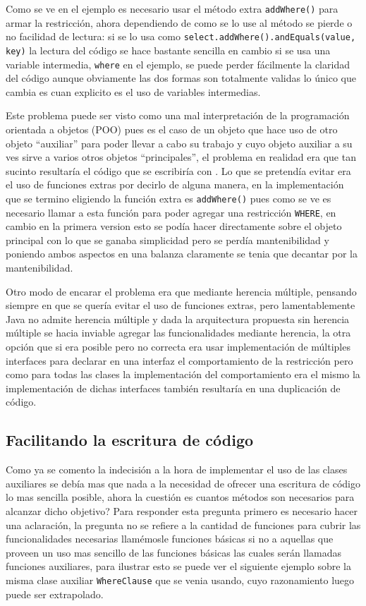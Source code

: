 Como se ve en el ejemplo es necesario usar el método extra \verb=addWhere()= para armar la restricción, ahora dependiendo de como se lo use al método se pierde o no facilidad de lectura:  si se lo usa como \verb=select.addWhere().andEquals(value, key)= la lectura del código se hace bastante sencilla en cambio si se usa una variable intermedia, \verb=where= en el ejemplo, se puede perder fácilmente la claridad del código aunque obviamente las dos formas son totalmente validas lo único que cambia es cuan explicito es el uso de variables intermedias.

Este problema puede ser visto como una mal interpretación de la programación orientada a objetos (POO) pues es el caso de un objeto que hace uso de otro objeto ``auxiliar'' para poder llevar a cabo su trabajo y cuyo objeto auxiliar a su ves sirve a varios otros objetos ``principales'', el problema en realidad era que tan sucinto resultaría el código que se escribiría con \jj. Lo que se pretendía evitar era el uso de funciones extras por decirlo de alguna manera, en la implementación que se termino eligiendo la función extra es \verb=addWhere()= pues como se ve es necesario llamar a esta función para poder agregar una restricción \verb=WHERE=, en cambio en la primera version esto se podía hacer directamente sobre el objeto principal con lo que se ganaba simplicidad pero se perdía mantenibilidad y poniendo ambos aspectos en una balanza claramente se tenia que decantar por la mantenibilidad.

Otro modo de encarar el problema era que mediante herencia múltiple, pensando siempre en que se quería evitar el uso de funciones extras, pero lamentablemente Java no admite herencia múltiple\cite{java:jdbc:tutorial} y dada la arquitectura propuesta sin herencia múltiple se hacia inviable agregar las funcionalidades mediante herencia, la otra opción que si era posible pero no correcta era usar implementación de múltiples interfaces para declarar en una interfaz el comportamiento de la restricción pero como para todas las clases la implementación del comportamiento era el mismo la implementación de dichas interfaces también resultaría en una duplicación de código.
%
\subsection{Facilitando la escritura de código}
\label{implementacion:manejador:facilitando}
Como ya se comento la indecisión a la hora de implementar el uso de las clases auxiliares se debía mas que nada a la necesidad de ofrecer una escritura de código lo mas sencilla posible, ahora la cuestión es cuantos métodos son necesarios para alcanzar dicho objetivo? Para responder esta pregunta primero es necesario hacer una aclaración, la pregunta no se refiere a la cantidad de funciones para cubrir las funcionalidades necesarias llamémosle funciones básicas si no a aquellas que proveen un uso mas sencillo de las funciones básicas las cuales serán llamadas funciones auxiliares, para ilustrar esto se puede ver el siguiente ejemplo sobre la misma clase auxiliar \verb=WhereClause= que se venia usando, cuyo razonamiento luego puede ser extrapolado.

